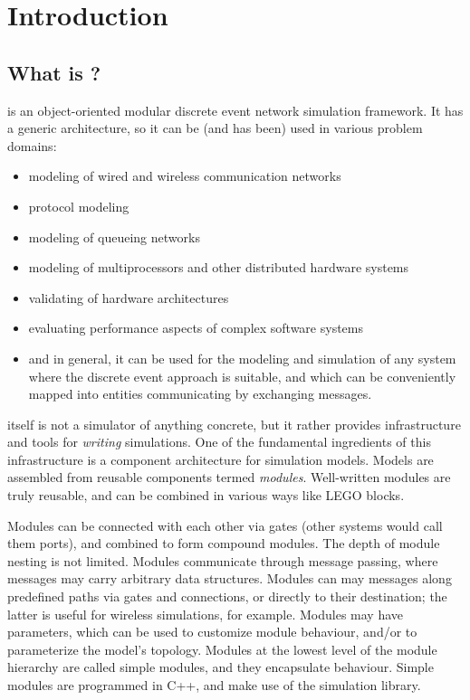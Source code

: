\chapter{Introduction}
\label{cha:introduction}


\section{What is {\opp}?}

{\opp} is an object-oriented modular discrete event network simulation
framework. It has a generic architecture, so it can be (and has been)
used in various problem domains:

\begin{itemize}
  \item{modeling of wired and wireless communication networks}
  \item{protocol modeling}
  \item{modeling of queueing networks}
  \item{modeling of multiprocessors and other distributed hardware systems}
  \item{validating of hardware architectures}
  \item{evaluating performance aspects of complex software systems}
  \item{and in general, it can be used for the modeling and simulation of
        any system where the discrete event approach is suitable, and which
        can be conveniently mapped into entities communicating by exchanging
        messages.}
\end{itemize}

{\opp} itself is not a simulator of anything concrete, but it rather
provides infrastructure and tools for \textit{writing} simulations. One of
the fundamental ingredients of this infrastructure is a component
architecture for simulation models. Models are assembled from reusable
components termed \textit{modules}. Well-written modules are truly reusable,
and can be combined in various ways like LEGO blocks.

Modules can be connected with each other via gates (other systems would
call them ports), and combined to form compound modules. The depth of
module nesting is not limited. Modules communicate through message passing,
where messages may carry arbitrary data structures. Modules can may
messages along predefined paths via gates and connections, or directly to
their destination; the latter is useful for wireless simulations, for
example. Modules may have parameters, which can be used to customize module
behaviour, and/or to parameterize the model's topology.
Modules at the lowest level of the module hierarchy are called
simple modules, and they encapsulate behaviour. Simple modules
are programmed in C++, and make use of the simulation library.

